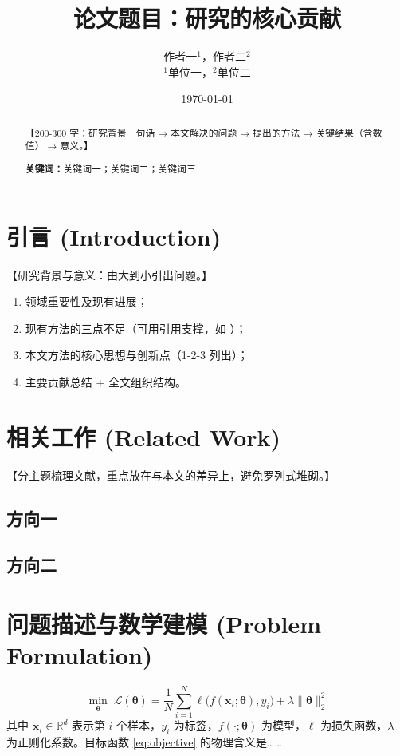 \documentclass[12pt,a4paper]{article}
\title{\textbf{论文题目：研究的核心贡献}}
\author{作者一$^{1}$，作者二$^{2}$ \\[0.3em]
\small $^{1}$单位一，$^{2}$单位二}
\date{\today}
\newcommand{\R}{\mathbb{R}}        %
\newcommand{\mat}[1]{\bm{#1}}      %
\begin{document}
\maketitle

\begin{abstract}
【200-300 字：研究背景一句话 → 本文解决的问题 → 提出的方法 → 关键结果（含数值） → 意义。】
\par\medskip
\textbf{关键词：}关键词一；关键词二；关键词三
\end{abstract}

\section{引言 (Introduction)}
【研究背景与意义：由大到小引出问题。】
\begin{enumerate}
    \item 领域重要性及现有进展；
    \item 现有方法的三点不足（可用引用支撑，如 \cite{ref1}）；
    \item 本文方法的核心思想与创新点（1-2-3 列出）；
    \item 主要贡献总结 + 全文组织结构。
\end{enumerate}

\section{相关工作 (Related Work)}
【分主题梳理文献，重点放在与本文的差异上，避免罗列式堆砌。】
\subsection{方向一}
\subsection{方向二}

\section{问题描述与数学建模 (Problem Formulation)}
\begin{equation}
    \min_{\mat{\theta}} \; \mathcal{L}(\mat{\theta}) = \frac{1}{N}\sum_{i=1}^{N} \ell\big(f(\mat{x}_i; \mat{\theta}), y_i\big) + \lambda \|\mat{\theta}\|_2^2
    \label{eq:objective}
\end{equation}
其中 $\mat{x}_i \in \R^d$ 表示第 $i$ 个样本，$y_i$ 为标签，$f(\cdot;\mat{\theta})$ 为模型，$\ell$ 为损失函数，$\lambda$ 为正则化系数。目标函数 \eqref{eq:objective} 的物理含义是……
\end{document}
